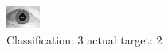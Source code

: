 \begin{figure}[h!]
\begin{center}
\includegraphics[width=0.60\columnwidth]{figures/ID1627_class_3_target_2.png}
\end{center}
\caption{ Classification: 3 actual target: 2}
\label{fig:ID1627_class_3_target_2}
\end{figure}
